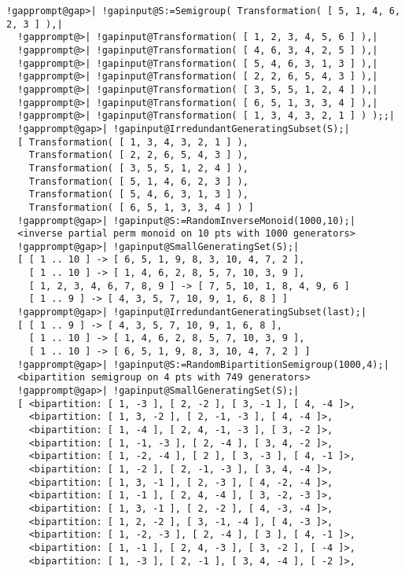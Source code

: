 \documentclass[a4paper,11pt]{report}
\begin{document}
{{{ 
\begin{Verbatim}[commandchars=!@|,fontsize=\small,frame=single,label=Example]
  !gapprompt@gap>| !gapinput@S:=Semigroup( Transformation( [ 5, 1, 4, 6, 2, 3 ] ),|
  !gapprompt@>| !gapinput@Transformation( [ 1, 2, 3, 4, 5, 6 ] ),|
  !gapprompt@>| !gapinput@Transformation( [ 4, 6, 3, 4, 2, 5 ] ),|
  !gapprompt@>| !gapinput@Transformation( [ 5, 4, 6, 3, 1, 3 ] ),|
  !gapprompt@>| !gapinput@Transformation( [ 2, 2, 6, 5, 4, 3 ] ),|
  !gapprompt@>| !gapinput@Transformation( [ 3, 5, 5, 1, 2, 4 ] ),|
  !gapprompt@>| !gapinput@Transformation( [ 6, 5, 1, 3, 3, 4 ] ),|
  !gapprompt@>| !gapinput@Transformation( [ 1, 3, 4, 3, 2, 1 ] ) );;|
  !gapprompt@gap>| !gapinput@IrredundantGeneratingSubset(S);|
  [ Transformation( [ 1, 3, 4, 3, 2, 1 ] ), 
    Transformation( [ 2, 2, 6, 5, 4, 3 ] ), 
    Transformation( [ 3, 5, 5, 1, 2, 4 ] ), 
    Transformation( [ 5, 1, 4, 6, 2, 3 ] ), 
    Transformation( [ 5, 4, 6, 3, 1, 3 ] ), 
    Transformation( [ 6, 5, 1, 3, 3, 4 ] ) ]
  !gapprompt@gap>| !gapinput@S:=RandomInverseMonoid(1000,10);|
  <inverse partial perm monoid on 10 pts with 1000 generators>
  !gapprompt@gap>| !gapinput@SmallGeneratingSet(S);|
  [ [ 1 .. 10 ] -> [ 6, 5, 1, 9, 8, 3, 10, 4, 7, 2 ], 
    [ 1 .. 10 ] -> [ 1, 4, 6, 2, 8, 5, 7, 10, 3, 9 ], 
    [ 1, 2, 3, 4, 6, 7, 8, 9 ] -> [ 7, 5, 10, 1, 8, 4, 9, 6 ]
    [ 1 .. 9 ] -> [ 4, 3, 5, 7, 10, 9, 1, 6, 8 ] ]
  !gapprompt@gap>| !gapinput@IrredundantGeneratingSubset(last);|
  [ [ 1 .. 9 ] -> [ 4, 3, 5, 7, 10, 9, 1, 6, 8 ], 
    [ 1 .. 10 ] -> [ 1, 4, 6, 2, 8, 5, 7, 10, 3, 9 ], 
    [ 1 .. 10 ] -> [ 6, 5, 1, 9, 8, 3, 10, 4, 7, 2 ] ]
  !gapprompt@gap>| !gapinput@S:=RandomBipartitionSemigroup(1000,4);|
  <bipartition semigroup on 4 pts with 749 generators>
  !gapprompt@gap>| !gapinput@SmallGeneratingSet(S);|
  [ <bipartition: [ 1, -3 ], [ 2, -2 ], [ 3, -1 ], [ 4, -4 ]>, 
    <bipartition: [ 1, 3, -2 ], [ 2, -1, -3 ], [ 4, -4 ]>, 
    <bipartition: [ 1, -4 ], [ 2, 4, -1, -3 ], [ 3, -2 ]>, 
    <bipartition: [ 1, -1, -3 ], [ 2, -4 ], [ 3, 4, -2 ]>, 
    <bipartition: [ 1, -2, -4 ], [ 2 ], [ 3, -3 ], [ 4, -1 ]>, 
    <bipartition: [ 1, -2 ], [ 2, -1, -3 ], [ 3, 4, -4 ]>, 
    <bipartition: [ 1, 3, -1 ], [ 2, -3 ], [ 4, -2, -4 ]>, 
    <bipartition: [ 1, -1 ], [ 2, 4, -4 ], [ 3, -2, -3 ]>, 
    <bipartition: [ 1, 3, -1 ], [ 2, -2 ], [ 4, -3, -4 ]>, 
    <bipartition: [ 1, 2, -2 ], [ 3, -1, -4 ], [ 4, -3 ]>, 
    <bipartition: [ 1, -2, -3 ], [ 2, -4 ], [ 3 ], [ 4, -1 ]>, 
    <bipartition: [ 1, -1 ], [ 2, 4, -3 ], [ 3, -2 ], [ -4 ]>, 
    <bipartition: [ 1, -3 ], [ 2, -1 ], [ 3, 4, -4 ], [ -2 ]>, 

\end{Verbatim}}}}
\end{document}
